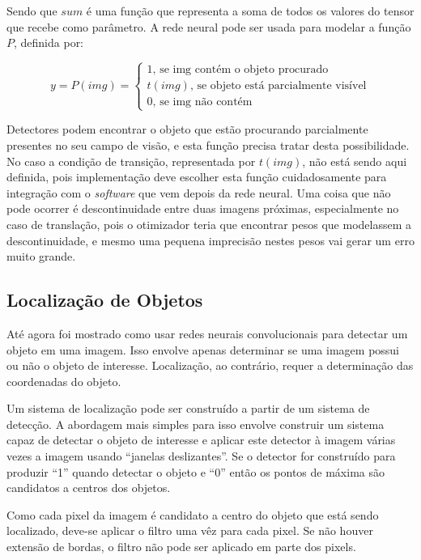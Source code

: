 Sendo que $sum$ é uma função que representa a soma de todos os valores do
tensor que recebe como parâmetro.
A rede neural pode ser usada para modelar a função $P$, definida por:

\begin{equation}
	y = P(img) = \begin{cases}
		1 \text{, se img contém o objeto procurado} \\
		t(img) \text{, se objeto está parcialmente visível} \\
		0 \text{, se img não contém}
	\end{cases}
\end{equation}

Detectores podem encontrar o objeto que estão procurando parcialmente presentes 
no seu campo de visão, e esta função precisa tratar desta possibilidade. No
caso a condição de transição, representada por $t(img)$, não está sendo
aqui definida, pois implementação deve escolher esta função cuidadosamente
para integração com o \emph{software} que vem depois da rede neural.
Uma coisa que não pode ocorrer é descontinuidade entre duas imagens próximas,
especialmente no caso de translação, pois o otimizador teria que encontrar
pesos que modelassem a descontinuidade, e mesmo uma pequena imprecisão nestes
pesos vai gerar um erro muito grande.

\subsection{Localização de Objetos} \label{sec:localiz_objetos}
Até agora foi mostrado como usar redes neurais convolucionais para detectar um
objeto em uma imagem. Isso envolve apenas determinar se uma imagem possui ou não
o objeto de interesse. Localização, ao contrário, requer a determinação das
coordenadas do objeto.

Um sistema de localização pode ser construído a partir de um sistema de
detecção. A abordagem mais simples para isso envolve construir um sistema capaz
de detectar o objeto de interesse e aplicar este
detector à imagem várias vezes a imagem usando ``janelas deslizantes''.
Se o detector for construído para produzir “1” quando detectar o objeto e
“0” então os pontos de máxima são candidatos a centros dos objetos.

Como cada pixel da imagem é candidato a centro do objeto que está sendo
localizado, deve-se aplicar o filtro uma vêz para cada pixel. Se não houver
extensão de bordas, o filtro não pode ser aplicado em parte dos pixels.

